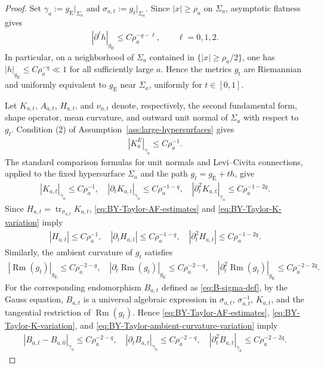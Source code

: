 \documentclass[10pt,a4paper]{amsart}
\newcommand{\gE}{g_{\mathrm{E}}}
\newcommand{\Rm}{\operatorname{Rm}}
\begin{document}
	\begin{proof}
		Set $\gamma_a:=\gE|_{\Sigma_a}$ and $\sigma_{a,t}:=g_t|_{\Sigma_a}$. Since $|x|\geq\rho_a$ on $\Sigma_a$, asymptotic flatness gives
		\begin{align}\label{eq:BY-Taylor-AF-estimates}
			|\partial^\ell h|_{\gE}
			\leq
			C\rho_a^{-q-\ell},
			\qquad
			\ell=0,1,2.
		\end{align}
		In particular, on a neighborhood of $\Sigma_a$ contained in
		$\{|x|\geq \rho_a/2\}$, one has $|h|_{\gE}\leq C\rho_a^{-q}\ll 1$ for all
		sufficiently large $a$. Hence the metrics $g_t$ are Riemannian and uniformly
		equivalent to $\gE$ near $\Sigma_a$, uniformly for $t\in[0,1]$.
		
		Let $K_{a,t}$, $A_{a,t}$, $H_{a,t}$, and $\nu_{a,t}$ denote,
		respectively, the second fundamental form, shape operator, mean curvature,
		and outward unit normal of $\Sigma_a$ with respect to $g_t$. Condition
		\textup{(2)} of Assumption~\ref{ass:large-hypersurfaces} gives
		\begin{align*}
			|K_a^E|_{\gamma_a}
			\leq
			C\rho_a^{-1}.
		\end{align*}
		The standard comparison formulas for unit normals and Levi--Civita
		connections, applied to the fixed hypersurface $\Sigma_a$ and the path
		$g_t=\gE+t h$, give
		\begin{align}\label{eq:BY-Taylor-K-variation}
			|K_{a,t}|_{\gamma_a}
			\leq
			C\rho_a^{-1},
			\quad
			|\partial_tK_{a,t}|_{\gamma_a}
			\leq
			C\rho_a^{-1-q},
			\quad
			|\partial_t^2K_{a,t}|_{\gamma_a}
			\leq
			C\rho_a^{-1-2q}.
		\end{align}
		Since $H_{a,t}=\operatorname{tr}_{\sigma_{a,t}}K_{a,t}$,
		\eqref{eq:BY-Taylor-AF-estimates} and
		\eqref{eq:BY-Taylor-K-variation} imply
		\begin{align}\label{eq:BY-Taylor-physical-H-variation}
			|H_{a,t}|
			\leq
			C\rho_a^{-1},
			\quad
			|\partial_tH_{a,t}|
			\leq
			C\rho_a^{-1-q},
			\quad
			|\partial_t^2H_{a,t}|
			\leq
			C\rho_a^{-1-2q}.
		\end{align}
		Similarly, the ambient curvature of $g_t$ satisfies
		\begin{align}\label{eq:BY-Taylor-ambient-curvature-variation}
			|\operatorname{Rm}(g_t)|_{\gE}
			\leq
			C\rho_a^{-2-q},
			\quad
			|\partial_t\operatorname{Rm}(g_t)|_{\gE}
			\leq
			C\rho_a^{-2-q},
			\quad
			|\partial_t^2\operatorname{Rm}(g_t)|_{\gE}
			\leq
			C\rho_a^{-2-2q}.
		\end{align}
		For the corresponding endomorphism $B_{a,t}$ defined as \eqref{eq:B-sigma-def}, by the Gauss equation, $B_{a,t}$ is a universal algebraic
		expression in $\sigma_{a,t}$, $\sigma_{a,t}^{-1}$, $K_{a,t}$, and the tangential restriction of $\Rm(g_t)$. Hence
		\eqref{eq:BY-Taylor-AF-estimates},
		\eqref{eq:BY-Taylor-K-variation}, and
		\eqref{eq:BY-Taylor-ambient-curvature-variation} imply
		\begin{align}\label{eq:BY-Taylor-Bendomorphism-variation}
			|B_{a,t}-B_{a,0}|_{\gamma_a}
			\leq
			C\rho_a^{-2-q},
			\quad
			|\partial_tB_{a,t}|_{\gamma_a}
			\leq
			C\rho_a^{-2-q},
			\quad
			|\partial_t^2B_{a,t}|_{\gamma_a}
			\leq
			C\rho_a^{-2-2q}.
		\end{align}
		

\end{proof}
\end{document}
